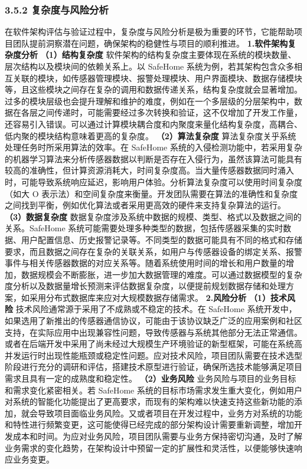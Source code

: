 \subsubsection{3.5.2 复杂度与风险分析}\label{ux590dux6742ux5ea6ux4e0eux98ceux9669ux5206ux6790}
在软件架构评估与验证过程中，复杂度与风险分析是极为重要的环节，它能帮助项目团队提前洞察潜在问题，确保架构的稳健性与项目的顺利推进。 \textbf{1.软件架构复杂度分析} \textbf{（1）结构复杂度}
软件架构的结构复杂度主要体现在系统的模块数量、层次结构以及模块间的依赖关系上。以 SafeHome
系统为例，若其架构包含众多相互关联的模块，如传感器管理模块、报警处理模块、用户界面模块、数据存储模块等，且这些模块之间存在复杂的调用和数据传递关系，结构复杂度就会显著增加。过多的模块层级也会提升理解和维护的难度，例如在一个多层级的分层架构中，数据在各层之间传递时，可能需要经过多次转换和验证，这不仅增加了开发工作量，还容易引入错误。可以通过计算模块耦合度和内聚度来量化结构复杂度，高耦合、低内聚的模块结构意味着更高的复杂度。
\textbf{（2）算法复杂度} 算法复杂度关乎系统处理任务时所采用算法的效率。在 SafeHome
系统的入侵检测功能中，若采用复杂的机器学习算法来分析传感器数据以判断是否存在入侵行为，虽然该算法可能具有较高的准确性，但计算资源消耗大，时间复杂度高。当大量传感器数据同时涌入时，可能导致系统响应延迟，影响用户体验。分析算法复杂度可以使用时间复杂度（如大
O 表示法）和空间复杂度来衡量。开发团队需要在算法的准确性和复杂度之间找到平衡，例如优化算法或者采用更高效的硬件来支持复杂算法的运行。 \textbf{（3）数据复杂度}
数据复杂度涉及系统中数据的规模、类型、格式以及数据之间的关系。SafeHome
系统可能需要处理多种类型的数据，包括传感器采集的实时数据、用户配置信息、历史报警记录等。不同类型的数据可能具有不同的格式和存储要求，而且数据之间存在复杂的关联关系，如用户与传感器设备的绑定关系、报警事件与相关传感器数据的对应关系等。随着系统使用时间的增长和用户数量的增加，数据规模会不断膨胀，进一步加大数据管理的难度。可以通过数据模型的复杂度分析以及数据量增长预测来评估数据复杂度，以便提前规划数据存储和处理方案，如采用分布式数据库来应对大规模数据存储需求。
\textbf{2.风险分析} \textbf{（1）技术风险} 技术风险通常源于采用了不成熟或不稳定的技术。在 SafeHome
系统开发中，如果选用了新推出的传感器通信协议，可能由于该协议缺乏广泛的应用案例和社区支持，在实际应用中出现兼容性问题，导致传感器与系统其他部分无法正常通信。或者在后端开发中采用了尚未经过大规模生产环境验证的新型框架，可能在系统高并发运行时出现性能瓶颈或稳定性问题。应对技术风险，项目团队需要在技术选型阶段进行充分的调研和评估，搭建技术原型进行验证，确保所选技术能够满足项目需求且具有一定的成熟度和稳定性。
\textbf{（2）业务风险} 业务风险与项目的业务目标和需求变化紧密相关。若 SafeHome
系统的目标市场需求发生重大变化，例如用户对系统的智能化功能提出了更高要求，而现有的架构难以快速支持这些新功能的添加，就会导致项目面临业务风险。又或者项目在开发过程中，业务方对系统的功能和特性进行频繁变更，这可能使得已经完成的部分架构设计需要重新调整，增加开发成本和时间。为应对业务风险，项目团队需要与业务方保持密切沟通，及时了解业务需求的变化趋势，在架构设计中预留一定的扩展性和灵活性，以便能够快速响应业务变更。
